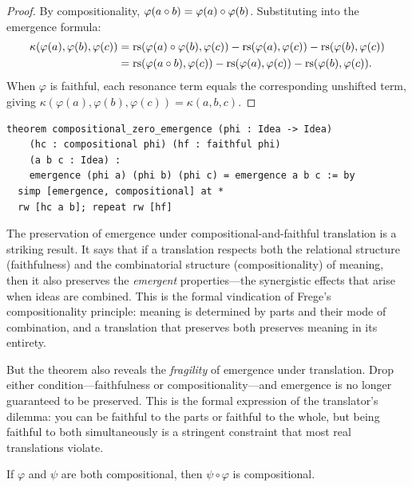 \begin{proof}
By compositionality, $\varphi(a \circ b) = \varphi(a) \circ \varphi(b)$.
Substituting into the emergence formula:
\begin{align*}
  \kappa(\varphi(a), \varphi(b), \varphi(c))
    &= \mathrm{rs}(\varphi(a) \circ \varphi(b), \varphi(c))
       - \mathrm{rs}(\varphi(a), \varphi(c)) - \mathrm{rs}(\varphi(b), \varphi(c)) \\
    &= \mathrm{rs}(\varphi(a \circ b), \varphi(c))
       - \mathrm{rs}(\varphi(a), \varphi(c)) - \mathrm{rs}(\varphi(b), \varphi(c)).
\end{align*}
When $\varphi$ is faithful, each resonance term equals the corresponding
unshifted term, giving
$\kappa(\varphi(a), \varphi(b), \varphi(c)) = \kappa(a, b, c)$.
\end{proof}

\begin{lstlisting}
theorem compositional_zero_emergence (phi : Idea -> Idea)
    (hc : compositional phi) (hf : faithful phi)
    (a b c : Idea) :
    emergence (phi a) (phi b) (phi c) = emergence a b c := by
  simp [emergence, compositional] at *
  rw [hc a b]; repeat rw [hf]
\end{lstlisting}

\begin{interpretation}
\label{int:compositional-frege}
The preservation of emergence under compositional-and-faithful translation
is a striking result.  It says that if a translation respects both the
relational structure (faithfulness) and the combinatorial structure
(compositionality) of meaning, then it also preserves the
\emph{emergent} properties---the synergistic effects that arise when ideas
are combined.  This is the formal vindication of Frege's compositionality
principle: meaning is determined by parts and their mode of combination,
and a translation that preserves both preserves meaning in its entirety.

But the theorem also reveals the \emph{fragility} of emergence under
translation.  Drop either condition---faithfulness or compositionality---and
emergence is no longer guaranteed to be preserved.  This is the formal
expression of the translator's dilemma: you can be faithful to the parts
or faithful to the whole, but being faithful to both simultaneously is a
stringent constraint that most real translations violate.
\end{interpretation}

\begin{theorem}
\label{thm:compositional-comp}
If $\varphi$ and $\psi$ are both compositional, then
$\psi \circ \varphi$ is compositional.
\end{theorem}

